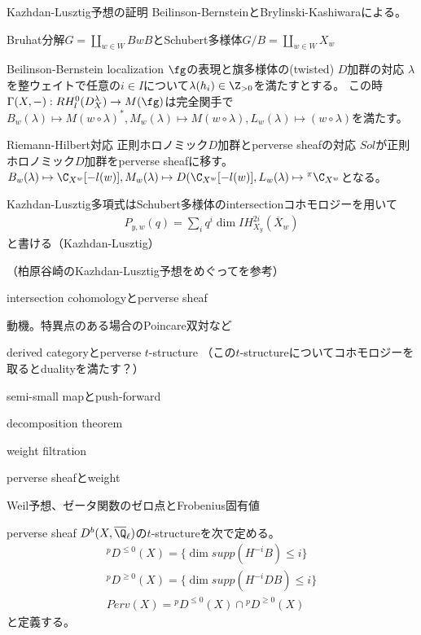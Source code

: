 \documentclass[dvipdfmx]{beamer}
\begin{document}
\begin{frame}{Kazhdan-Lusztig予想の証明}
Beilinson-BernsteinとBrylinski-Kashiwaraによる。

Bruhat分解$G=\coprod_{w\in W}BwB$とSchubert多様体$G/B=\coprod_{w\in W}X_w$

Beilinson-Bernstein localization
$\fg$の表現と旗多様体の(twisted) $D$加群の対応
$\lambda$を整ウェイトで任意の$i\in I$について$\lambda(h_i)\in\Z_{>0}$を満たすとする。
この時$\Gamma(X,-):RH^0_l(D^\lambda_X) \to M(\fg)$は完全関手で
$B_w(\lambda)\mapsto M(w\circ\lambda)^*, M_w(\lambda)\mapsto M(w\circ\lambda), L_w(\lambda)\mapsto(w\circ\lambda)$を満たす。

Riemann-Hilbert対応
正則ホロノミック$D$加群とperverse sheafの対応
$Sol$が正則ホロノミック$D$加群をperverse sheafに移す。
$B_w(\lambda)\mapsto \C_{X^w}[-l(w)], M_w(\lambda)\mapsto D(\C_{X^w}[-l(w)],L_w(\lambda)\mapsto {}^\pi\C_{X^w}$となる。

Kazhdan-Lusztig多項式はSchubert多様体のintersectionコホモロジーを用いて
\begin{align*}
P_{y,w}(q)=\sum_iq^i\dim IH_{X_y}^{2i}(\overline{X}_w)
\end{align*}
と書ける（Kazhdan-Lusztig）

（柏原谷崎のKazhdan-Lusztig予想をめぐってを参考）
\end{frame}

\begin{frame}{intersection cohomologyとperverse sheaf}

動機。特異点のある場合のPoincare双対など

derived categoryとperverse $t$-structure
（この$t$-structureについてコホモロジーを取るとdualityを満たす？）

semi-small mapとpush-forward

decomposition theorem

weight filtration

perverse sheafとweight

Weil予想、ゼータ関数のゼロ点とFrobenius固有値
\end{frame}

\begin{frame}{perverse sheaf}
$D^b(X,\overline{\Q}_\ell)$の$t$-structureを次で定める。
\begin{align*}
{}^pD^{\leq 0}(X)=\{\dim supp(H^{-i}B)\leq i\}\\
{}^pD^{\geq 0}(X)=\{\dim supp(H^{-i}DB)\leq i\}\\
Perv(X)={}^pD^{\leq0}(X)\cap{}^pD^{\geq0}(X)
\end{align*}
と定義する。
\end{frame}
\end{document}
